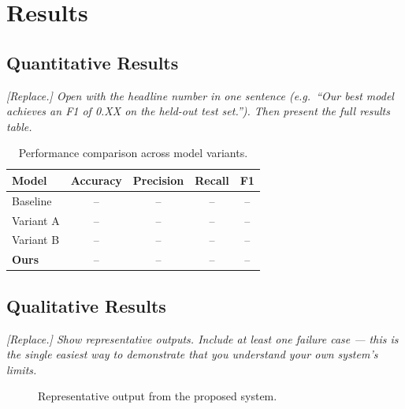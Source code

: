 
\chapter{Results}
\label{ch:results}

\section{Quantitative Results}
\label{sec:results-quant}

\textit{[Replace.] Open with the headline number in one sentence (e.g.\ ``Our
best model achieves an F1 of 0.XX on the held-out test set.''). Then present
the full results table.}

\begin{table}[htbp]
  \centering
  \caption{Performance comparison across model variants.}
  \label{tab:results-comparison}
  \begin{tabular}{@{}lcccc@{}}
    \toprule
    Model & Accuracy & Precision & Recall & F1 \\
    \midrule
    Baseline   & -- & -- & -- & -- \\
    Variant A  & -- & -- & -- & -- \\
    Variant B  & -- & -- & -- & -- \\
    \textbf{Ours} & -- & -- & -- & -- \\
    \bottomrule
  \end{tabular}
\end{table}

\section{Qualitative Results}
\label{sec:results-qual}

\textit{[Replace.] Show representative outputs. Include at least one failure
case — this is the single easiest way to demonstrate that you understand your
own system's limits.}

\begin{figure}[htbp]
  \centering
  \caption{Representative output from the proposed system.}
  \label{fig:qualitative}
\end{figure}

